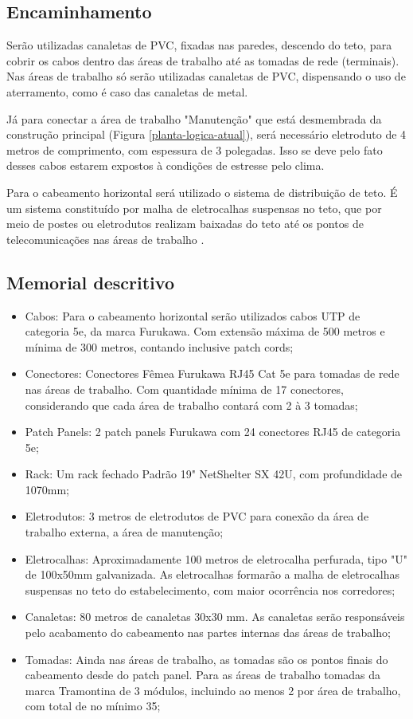 \documentclass[	DIV=calc,%
							paper=a4,%
							fontsize=12pt,%
							onecolumn]{scrartcl}	 					%
\begin{document}
\subsection{Encaminhamento}

Serão utilizadas canaletas de PVC, fixadas nas paredes, descendo do teto, para cobrir os cabos dentro das áreas de trabalho até as tomadas de rede (terminais). Nas áreas de trabalho só serão utilizadas canaletas de PVC, dispensando o uso de aterramento, como é caso das canaletas de metal.

Já para conectar a área de trabalho "Manutenção" que está desmembrada da construção principal (Figura \ref{planta-logica-atual}), será necessário eletroduto de 4 metros de comprimento, com espessura de 3 polegadas. Isso se deve pelo fato desses cabos estarem expostos à condições de estresse pelo clima.

Para o cabeamento horizontal será utilizado o sistema de distribuição de teto. É um sistema constituído por malha de eletrocalhas suspensas no teto, que por meio de postes ou eletrodutos realizam baixadas do teto até os pontos de telecomunicações nas áreas de trabalho \cite{senai2012}.\newpage


\subsection{Memorial descritivo}

\begin{itemize}
	\item Cabos: Para o cabeamento horizontal serão utilizados cabos UTP de categoria 5e, da marca Furukawa. Com extensão máxima de 500 metros e mínima de 300 metros, contando inclusive patch cords;
	\item Conectores: Conectores Fêmea Furukawa RJ45 Cat 5e para tomadas de rede nas áreas de trabalho. Com quantidade mínima de 17 conectores, considerando que cada área de trabalho contará com 2 à 3 tomadas;
	\item Patch Panels: 2 patch panels Furukawa com 24 conectores RJ45 de categoria 5e;
	\item Rack: Um rack fechado Padrão 19" NetShelter SX 42U, com  profundidade de 1070mm;
	\item Eletrodutos: 3 metros de eletrodutos de PVC para conexão da área de trabalho externa, a área de manutenção; 
	\item Eletrocalhas: Aproximadamente 100 metros de eletrocalha perfurada, tipo "U" de 100x50mm galvanizada. As eletrocalhas formarão a  malha de eletrocalhas suspensas no teto do estabelecimento, com maior ocorrência nos corredores;
	\item Canaletas: 80 metros de canaletas 30x30 mm. As canaletas serão responsáveis pelo acabamento do cabeamento nas partes internas das áreas de trabalho;
	\item Tomadas: Ainda nas áreas de trabalho, as tomadas são os pontos finais do cabeamento desde do patch panel. Para as áreas de trabalho tomadas da marca Tramontina de 3 módulos, incluindo ao menos 2 por área de trabalho, com total de no mínimo 35;\label{key}
\end{itemize}\newpage
\end{document}
